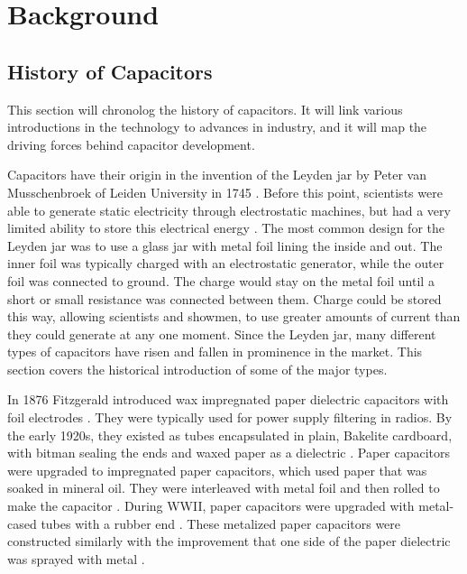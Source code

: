 \section {Background}

\subsection {History of Capacitors}
\label{sec:history}

This section will chronolog the history of capacitors. It will link various introductions in the technology to advances in industry, and it will map the driving forces behind capacitor development.

Capacitors have their origin in the invention of the Leyden jar by Peter van Musschenbroek of Leiden University in 1745 \cite{empLight}. Before this point, scientists were able to generate static electricity through electrostatic machines, but had a very limited ability to store this electrical energy \cite{ieee_hist}.
The most common design for the Leyden jar was to use a glass jar with metal foil lining the inside and out. The inner foil was typically charged with an electrostatic generator, while the outer foil was connected to ground. The charge would stay on the metal foil until a short or small resistance was connected between them. Charge could be stored this way, allowing scientists and showmen, to use greater amounts of current than they could generate at any one moment.
Since the Leyden jar, many different types of capacitors have risen and fallen in prominence in the market. This section covers the historical introduction of some of the major types.

In 1876 Fitzgerald introduced wax impregnated paper dielectric capacitors with foil electrodes \cite[ch.~11]{dumInv}\cite{learn_caps}. They were typically used for power supply filtering in radios. By the early 1920s, they existed as tubes encapsulated in plain, Bakelite cardboard, with bitman sealing the ends and waxed paper as a dielectric \cite[ch~3]{dumInv}.
Paper capacitors were upgraded to impregnated paper capacitors, which used paper that was soaked in mineral oil. They were interleaved with metal foil and then rolled to make the capacitor \cite[ch.~8.2.1.1]{poorIntro}. During WWII, paper capacitors were upgraded with metal-cased tubes with a rubber end \cite[ch.~8.1]{poorIntro}. These metalized paper capacitors were constructed similarly with the improvement that one side of the paper dielectric was sprayed with metal \cite{hist_cerFilt}.

